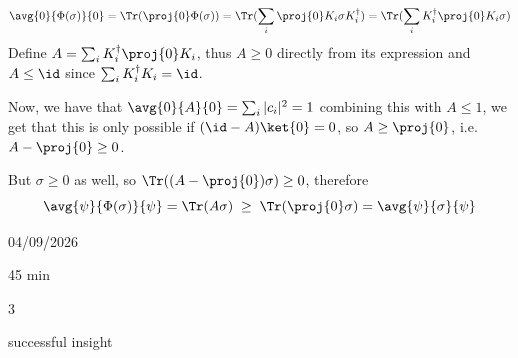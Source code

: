 \begin{solution}[Part (b)]
\begin{equation}
    \avg{0}{\Phi(\sigma)}{0} = \Tr(\proj{0}\Phi(\sigma))=\Tr(\sum_i\proj{0}K_i\sigma K_i^\dagger)=\Tr(\sum_iK_i^\dagger\proj{0}K_i\sigma )
\end{equation}
Define $A=\sum_iK_i^\dagger\proj{0}K_i$, thus $A\geq 0$ directly from its expression and $A \leq \id$ since $ \sum_i K_i^{\dagger} K_i = \id$. 

Now, we have that $\avg{0}{A}{0}=\sum_i |c_i|^2=1$ combining this with $A\leq 1$, we get that this is only possible if $(\id - A) \ket{0}=0$, so $A\geq \proj{0}$, i.e. $A-\proj{0} \geq 0$. 

But $\sigma \geq 0$ as well, so $\Tr((A-\proj{0})\sigma) \geq 0$, therefore
\begin{equation}
\avg{\psi}{\Phi(\sigma)}{\psi}= \Tr(A\sigma) \;\ge\; \Tr(\proj{0}\sigma)=\avg{\psi}{\sigma}{\psi}
\end{equation}
\end{solution}



\begin{attemptlog}
  \item[Date] 04/09/2026
  \item[Time taken] 45 min
  \item[Difficulty] 3
  \item[User Opinion] successful insight
\end{attemptlog}